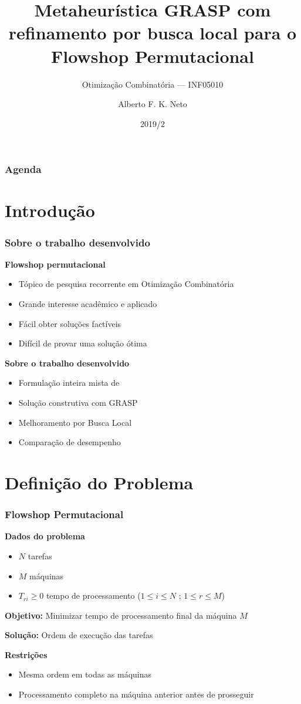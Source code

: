 \documentclass[professionalfonts]{beamer}
\title[GRASP+BL para Flowshop]{Metaheurística GRASP com refinamento por busca local para o Flowshop Permutacional}
\subtitle{Otimização Combinatória --- INF05010}
\date{2019/2}
\author{Alberto F. K. Neto}
\institute{CUSTOM LAST PAGE, CHECK BELOW}
\begin{document}
\InfTitlePage%

\begin{frame}
   \frametitle{Agenda}
   \tableofcontents
\end{frame}

\section{Introdução}

\begin{frame}
   \frametitle{Sobre o trabalho desenvolvido}

   \textbf{Flowshop permutacional}
   \begin{itemize}
      \item Tópico de pesquisa recorrente em Otimização Combinatória
      \item Grande interesse acadêmico e aplicado
      \item Fácil obter soluções factíveis
      \item Difícil de provar uma solução ótima
   \end{itemize}

   \medskip
   \textbf{Sobre o trabalho desenvolvido}
   \begin{itemize}
      \item Formulação inteira mista de \cite{tseng2004-flowshop-models}
      \item Solução construtiva com GRASP
      \item Melhoramento por Busca Local
      \item Comparação de desempenho
   \end{itemize}
\end{frame}

\section{Definição do Problema}

\begin{frame}
   \frametitle{Flowshop Permutacional}

   \textbf{Dados do problema}
   \begin{itemize}
      \item $N$ tarefas
      \item $M$ máquinas
      \item $T_{ri} \geqslant 0$ tempo de processamento ($1 \leqslant i \leqslant N$ 
         ; $1 \leqslant r \leqslant M$)
   \end{itemize}

   \medskip
   \textbf{Objetivo:} Minimizar tempo de processamento final da máquina $M$

   \medskip
   \textbf{Solução:} Ordem de execução das tarefas

   \medskip
   \textbf{Restrições}
   \begin{itemize}
      \item Mesma ordem em todas as máquinas
      \item Processamento completo na máquina anterior antes de prosseguir 
   \end{itemize}
\end{frame}
\end{document}
